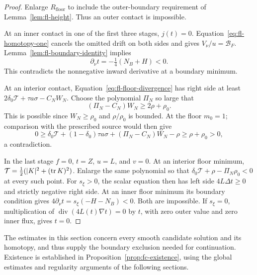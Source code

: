 \begin{proof}
Enlarge \(R_{\mathrm{floor}}\) to include the outer-boundary
requirement of Lemma~\ref{lem:fl-height}.  Thus an outer contact is
impossible.

At an inner contact in one of the first three stages, \(j(t)=0\).
Equation~\eqref{eq:fl-homotopy-one} cancels the omitted drift on
both sides and gives \(V_\nu/u=\mathcal B_F\).
Lemma~\ref{lem:fl-boundary-identity} implies
\[
 \partial_\nu t=-\tfrac14(N_B+H)<0 .
\]
This contradicts the nonnegative inward derivative at a boundary
minimum.

At an interior contact, Equation~\eqref{eq:fl-floor-divergence}
has right side at least
\(2\delta_0\mathcal T+\tau a\sigma-C_NW_N\).
Choose the polynomial \(\Pi_N\) so large that
\[
 (\Pi_N-C_N)W_N\ge 2\rho+\rho_0 .
\]
This is possible since \(W_N\ge\rho_0\) and
\(\rho/\rho_0\) is bounded.  At the floor \(m_0=1\);
comparison with the prescribed source would then give
\[
 0\ge
 \delta_0\mathcal T+(1-\delta_0)\tau a\sigma
           +(\Pi_N-C_N)W_N-\rho
 \ge\rho+\rho_0>0,
\]
a contradiction.

In the last stage \(f=0\), \(t=Z\), \(u=L\), and \(v=0\).
At an interior floor minimum,
\(\mathcal T=\frac12(\lvert K\rvert^2+(\operatorname{tr} K)^2)\).
Enlarge the same polynomial so that
\(\delta_0\mathcal T+\rho-\Pi_N\rho_0<0\) at every such point.
For \(s_\xi>0\), the scalar equation then has
left side \(4L\Delta t\ge0\) and strictly negative right side.
At an inner floor minimum its boundary condition gives
\(4\partial_\nu t=s_\xi(-H-N_B)<0\).
Both are impossible.  If \(s_\xi=0\), multiplication of
\(\operatorname{div}(4L(t)\nabla t)=0\) by \(t\), with zero outer
value and zero inner flux, gives \(t=0\).
\end{proof}

The estimates in this section concern every smooth candidate solution
and its homotopy, and thus supply the boundary exclusion needed for
continuation.  Existence is established in
Proposition~\ref{prop:fc-existence}, using the global estimates and
regularity arguments of the following sections.
